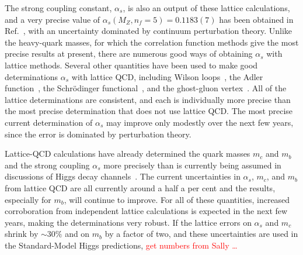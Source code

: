 \begin{itemize}
The strong coupling constant, $\alpha_s$, is also an output of these lattice calculations, and a very
precise value of $\alpha_s(M_Z, n_f=5) = 0.1183(7)$ has been obtained in Ref.~\cite{McNeile:2010ji}, 
with an uncertainty dominated by continuum perturbation theory.
Unlike the heavy-quark masses, for which the correlation function methods give the most precise
results at present, there are numerous good ways of obtaining $\alpha_s$ with lattice methods.  
Several other quantities have been used to make good determinations $\alpha_s$ with lattice QCD, including
Wilson loops~\cite{McNeile:2010ji}, the Adler function~\cite{Shintani:2010ph},
the Schr{\"o}dinger functional~\cite{Aoki:2009tf},
and the ghost-gluon vertex~\cite{Blossier:2012ef}.
All of the lattice determinations are consistent, and each is individually more precise than the most
precise determination that does not use lattice QCD.
The most precise current determination of $\alpha_s$ may improve only modestly over the next
few years, since the error is dominated by perturbation theory.

Lattice-QCD calculations have already determined the quark masses $m_c$ and $m_b$ and the strong coupling $\alpha_s$ more precisely than is currently
being assumed in discussions of Higgs decay channels~\cite{Denner:2011mq}.  The current uncertainties in $\alpha_s$, $m_c$, and $m_b$ from lattice QCD are all currently around a half a per cent and the results, especially for $m_b$, will continue to improve.  For all of these quantities, increased corroboration from independent lattice calculations is expected in the next few years, making the determinations very robust.  If the lattice errors on $\alpha_s$ and $m_c$ shrink by $\sim 30\%$ and on $m_b$ by a factor of two, and these uncertainties are used in the Standard-Model Higgs predictions, \textcolor{red}{get numbers from Sally \ldots}


\end{itemize}
